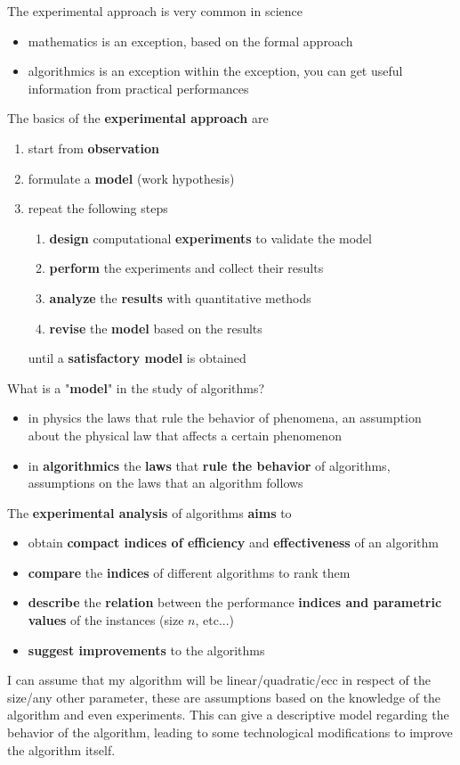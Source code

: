 \documentclass[11pt]{article}
\begin{document}
	The experimental approach is very common in science
	\begin{itemize}
		\item mathematics is an exception, based on the formal approach
		\item algorithmics is an exception within the exception, you can get useful information from practical performances
	\end{itemize}
	The basics of the \textbf{experimental approach} are
	\begin{enumerate}
		\item start from \textbf{observation}
		\item formulate a \textbf{model} (work hypothesis)
		\item repeat the following steps
		\begin{enumerate}[label=\alph*.]
			\item \textbf{design} computational \textbf{experiments} to validate the model
			\item \textbf{perform} the experiments and collect their results
			\item \textbf{analyze} the \textbf{results} with quantitative methods
			\item \textbf{revise} the \textbf{model} based on the results
		\end{enumerate}
		until a \textbf{satisfactory model} is obtained
	\end{enumerate}
	
	\newpage
	
	What is a "\textbf{model}" in the study of algorithms? 
	\begin{itemize}
		\item in physics the laws that rule the behavior of phenomena, an assumption about the physical law that affects a certain phenomenon
		\item in \textbf{algorithmics} the \textbf{laws} that \textbf{rule the behavior} of algorithms, assumptions on the laws that an algorithm follows
	\end{itemize}
	
	The \textbf{experimental analysis} of algorithms \textbf{aims} to
	\begin{itemize}
		\item obtain \textbf{compact indices of efficiency} and \textbf{effectiveness} of an algorithm
		\item \textbf{compare} the \textbf{indices} of different algorithms to rank them
		\item \textbf{describe} the \textbf{relation} between the performance \textbf{indices and parametric values} of the instances (size $n$, etc...)
		\item \textbf{suggest improvements} to the algorithms
	\end{itemize}
	I can assume that my algorithm will be linear/quadratic/ecc in respect of the size/any other parameter, these are assumptions based on the knowledge of the algorithm and even experiments. This can give a descriptive model regarding the behavior of the algorithm, leading to some technological modifications to improve the algorithm itself.\\
	
\end{document}
